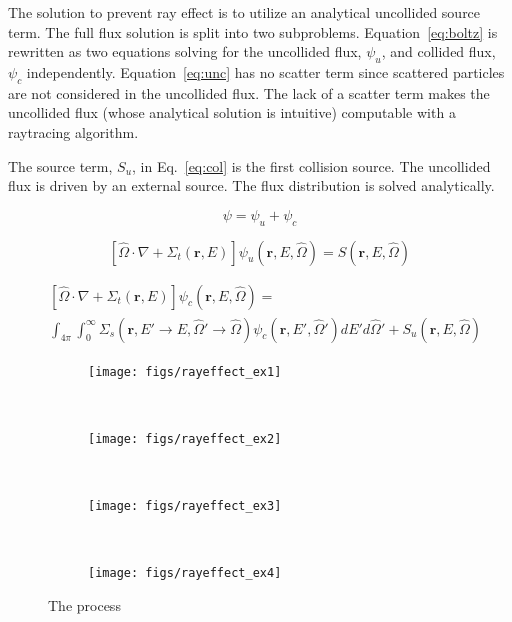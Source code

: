 The solution to prevent ray effect is to utilize an analytical uncollided source term. The full flux solution is split into two subproblems. Equation~\ref{eq:boltz} is rewritten as two equations solving for the uncollided flux, $\psi_u$, and collided flux, $\psi_c$ independently. Equation~\ref{eq:unc} has no scatter term since scattered particles are not considered in the uncollided flux. The lack of a scatter term makes the uncollided flux (whose analytical solution is intuitive) computable with a raytracing algorithm.

The source term, $S_u$, in Eq.~\ref{eq:col} is the first collision source. The uncollided flux is driven by an external source. The flux distribution is solved analytically.

\begin{equation} \label{eq:totflux}
\psi = \psi_u + \psi_c
\end{equation}

\begin{equation} \label{eq:unc}
\left[ \hat{\Omega} \cdot \nabla + \Sigma_t(\boldsymbol{r}, E) \right]
\psi_u(\boldsymbol{r}, E, \hat{\Omega}) =  S(\boldsymbol{r}, E, \hat{\Omega})
\end{equation}

\begin{equation} \label{eq:col}
\begin{split}
	&\left[ \hat{\Omega} \cdot \nabla + \Sigma_t(\boldsymbol{r}, E) \right]
	\psi_c(\boldsymbol{r}, E, \hat{\Omega}) = \\
	&\int_{4 \pi} \int_0^\infty \Sigma_s(\boldsymbol{r}, E' \rightarrow E, \hat{\Omega}' \rightarrow \hat{\Omega}) \psi_c(\boldsymbol{r}, E', \hat{\Omega}') dE' d\hat{\Omega}' + S_{u}(\boldsymbol{r}, E, \hat{\Omega})
\end{split}
\end{equation}

\begin{figure}
    \centering
    \begin{subfigure}[b]{0.2\textwidth}
        \texttt{[image: figs/rayeffect\_ex1]}
        \caption{}
        \label{fig:rayeffect_ex1}
    \end{subfigure}
    ~ 
    \begin{subfigure}[b]{0.2\textwidth}
        \texttt{[image: figs/rayeffect\_ex2]}
        \caption{}
        \label{fig:rayeffect_ex2}
    \end{subfigure}
    ~ 
    \begin{subfigure}[b]{0.2\textwidth}
        \texttt{[image: figs/rayeffect\_ex3]}
        \caption{}
        \label{fig:rayeffect_ex3}
    \end{subfigure}
    ~
    \begin{subfigure}[b]{0.2\textwidth}
        \texttt{[image: figs/rayeffect\_ex4]}
        \caption{}
        \label{fig:rayeffect_ex4}
    \end{subfigure}
    \caption{The process}\label{fig:rayeffect_ex}
\end{figure}


